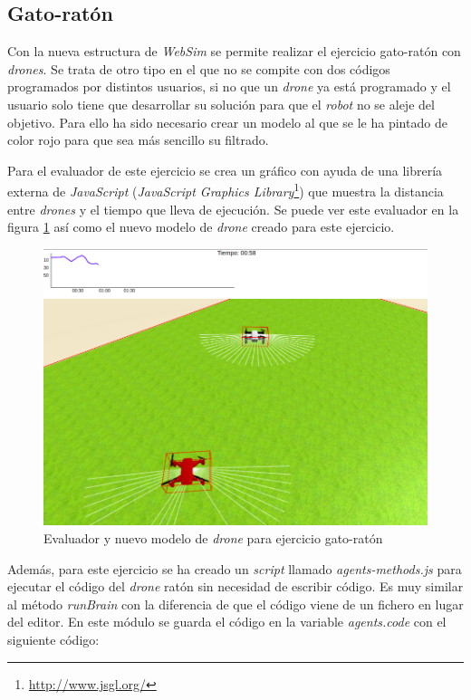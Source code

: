 \subsection{Gato-ratón}

Con la nueva estructura de \textit{WebSim} se permite realizar el ejercicio gato-ratón con \textit{drones}. Se trata de otro tipo en el que no se compite con dos códigos programados por distintos usuarios, si no que un \textit{drone} ya está programado y el usuario solo tiene que desarrollar su solución para que el \textit{robot} no se aleje del objetivo. Para ello ha sido necesario crear un modelo al que se le ha pintado de color rojo para que sea más sencillo su filtrado. 

Para el evaluador de este ejercicio se crea un gráfico con ayuda de una librería externa de \textit{JavaScript} (\textit{JavaScript Graphics Library}\footnote{\url{http://www.jsgl.org/}}) que muestra la distancia entre \textit{drones} y el tiempo que lleva de ejecución. Se puede ver este evaluador en la figura \ref{fig:evaluador_gato_raton} así como el nuevo modelo de \textit{drone} creado para este ejercicio.
  

\begin{figure}[ht]
\centering           
\includegraphics[scale=0.3]{img/evaluador_drone.png}
\caption{Evaluador y nuevo modelo de \textit{drone} para ejercicio gato-ratón}
\label{fig:evaluador_gato_raton}
\end{figure}

Además, para este ejercicio se ha creado un \textit{script} llamado \textit{agents-methods.js} para ejecutar el código del \textit{drone} ratón sin necesidad de escribir código. Es muy similar al método \textit{runBrain} con la diferencia de que el código viene de un fichero en lugar del editor. En este módulo se guarda el código en la variable \textit{agents.code} con el siguiente código: 

